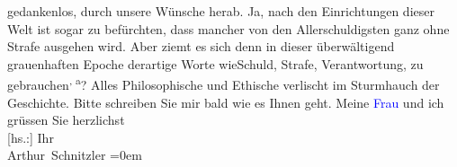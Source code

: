                     gedankenlos, durch unsere Wünsche herab. Ja, nach den Einrichtungen dieser Welt
                    ist sogar zu befürchten, dass mancher von den Allerschuldigsten ganz ohne Strafe
                    ausgehen wird. Aber ziemt es sich \introOben{}denn\introOben{} in dieser
                    überwältigend grauenhaften Epoche derartige Worte \introOben{}wie\introOben{}{ }Schuld, Strafe, Verantwortung,
                    zu gebrauchen\substVorne{}\textsuperscript{, a}\substDazwischen{}? A\substHinten{}lles Philosophische und Ethische verlischt im Sturmhauch der
                    Geschichte.\pend
           \pstart
           Bitte schreiben Sie mir bald wie es Ihnen geht. Meine \textcolor{blue}{Frau}{} und ich grüssen Sie herzlichst{\\[\baselineskip]}{[}hs.:{]} Ihr{\\[\baselineskip]}\spacefill\mbox{Arthur Schnitzler}\pend
           \leftskip=0em{}\endnumbering{}  
      
